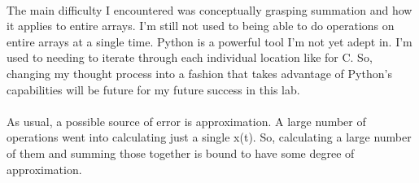 \documentclass[12pt]{report}
\begin{document}
\paragraph{} The main difficulty I encountered was conceptually grasping summation and how it applies to entire arrays. I'm still not used to being able to do operations on entire arrays at a single time. Python is a powerful tool I'm not yet adept in. I'm used to needing to iterate through each individual location like for C. So, changing my thought process into a fashion that takes advantage of Python's capabilities will be future for my future success in this lab. 

\paragraph{} As usual, a possible source of error is approximation. A large number of operations went into calculating just a single x(t). So, calculating a large number of them and summing those together is bound to have some degree of approximation.  
\end{document}
